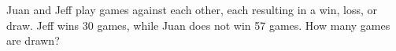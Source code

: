 Juan and Jeff play games against each other, each resulting in a win, loss, or draw. Jeff wins 30 games, while Juan does not win 57 games. How many games are drawn?
